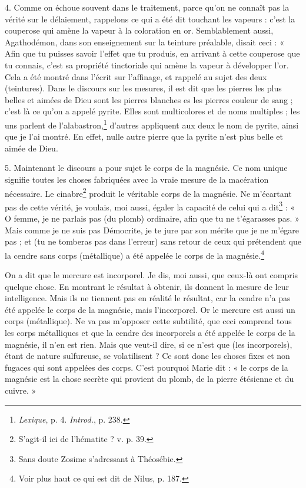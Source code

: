 \documentclass[landscape, a4paper, 11pt, oneside, polutonikogreek, french]{article}
\begin{document}
4. Comme on échoue souvent dans le traitement, parce qu'on ne connaît pas la vérité sur le délaiement, rappelons ce qui a été dit touchant les vapeurs : c'est la couperose qui amène la vapeur à la coloration en or. Semblablement aussi, Agathodémon, dans son enseignement sur la teinture préalable, disait ceci : « Afin que tu puisses savoir l'effet que tu produis, en arrivant à cette couperose que tu connais, c'est sa propriété tinctoriale qui amène la vapeur à développer l'or. Cela a été montré dans l'écrit sur l'affinage, et rappelé au sujet des deux (teintures). Dans le discours sur les mesures, il est dit que les pierres les plus belles et aimées de Dieu sont les pierres blanches es les pierres couleur de sang ; c'est là ce qu'on a appelé pyrite. Elles sont multicolores et de noms multiples ; les uns parlent de l'alabastron,\footnote{\emph{Lexique}, p. 4. \emph{Introd.}, p. 238.} d'autres appliquent aux deux le nom de pyrite, ainsi que je l'ai montré. En effet, nulle autre pierre que la pyrite n'est plus belle et aimée de Dieu.

5. Maintenant le discours a pour sujet le corps de la magnésie. Ce nom unique signifie toutes les choses fabriquées avec la vraie mesure de la macération nécessaire. Le cinabre\footnote{S'agit-il ici de l'hématite ? v. p. 39.} produit le véritable corps de la magnésie. Ne m'écartant pas de cette vérité, je voulais, moi aussi, égaler la capacité de celui qui a dit\footnote{Sans doute Zosime s'adressant à Théosébie.} : « O femme, je ne parlais pas (du plomb) ordinaire, afin que tu ne t'égarasses pas. » Mais comme je ne suis pas Démocrite, je te jure par son mérite que je ne m'égare pas ; et (tu ne tomberas pas dans l'erreur) sans retour de ceux qui prétendent que la cendre sans corps (métallique) a été appelée le corps de la magnésie.\footnote{Voir plus haut ce qui est dit de Nilus, p. 187.}

On a dit que le mercure est incorporel. Je dis, moi aussi, que ceux-là ont compris quelque chose. En montrant le résultat à obtenir, ils donnent la mesure de leur intelligence. Mais ils ne tiennent pas en réalité le résultat, car la cendre n'a pas été appelée le corps de la magnésie, mais l'incorporel. Or le mercure est aussi un corps (métallique). Ne va pas m'opposer cette subtilité, que ceci comprend tous les corps métalliques et que la cendre des incorporels a été appelée le corps de la magnésie, il n'en est rien. Mais que veut-il dire, si ce n'est que (les incorporels), étant de nature sulfureuse, se volatilisent ? Ce sont donc les choses fixes et non fugaces qui sont appelées des corps. C'est pourquoi Marie dit : « le corps de la magnésie est la chose secrète qui provient du plomb, de la pierre étésienne et du cuivre. »
\end{document}
